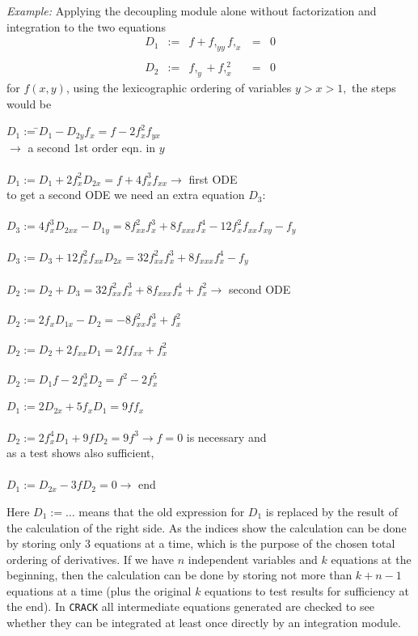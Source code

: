 {\em Example:}
Applying the decoupling module alone without factorization and integration 
to the two equations 
\[ \begin{array}{rclcl}
 D_1 & := & f + f,_{yy}f,_x & = & 0 \\ \\
 D_2 & := & f,_y + f,_x^2   & = & 0
\end{array} \]
for $f(x,y)$, using the lexicographic ordering of variables $y>x>1,$
the steps would be 
\begin{tabbing}
$D_1:=$\=$D_1-D_{2y}f_x=f-2f_x^2f_{yx}$ \\
     \> $\rightarrow$  a second 1st order eqn. in $y$\\ \\
$D_1:=$\>$D_1+2f_x^2D_{2x}=f+4f_x^3f_{xx} \rightarrow$  first ODE \\
     \> to get a second ODE we need an extra equation $D_3:$ \\ \\
$D_3:=$\>$4f_x^3D_{2xx}-D_{1y}=8f_{xx}^2f_x^3+8f_{xxx}f_x^4-12f_x^2f_{xx}f_{xy}
-f_y$ \\ \\
$D_3:=$\>$D_3+12f_x^2f_{xx}D_{2x}=32f_{xx}^2f_x^3+8f_{xxx}f_x^4-f_y$
\\ \\
$D_2:=$\>$D_2+D_3=32f_{xx}^2f_x^3+8f_{xxx}f_x^4+f_x^2 \rightarrow$ 
second ODE \\ \\
$D_2:=$\>$2f_xD_{1x}-D_2=-8f_{xx}^2f_x^3+f_x^2$ \\ \\
$D_2:=$\>$D_2+2f_{xx}D_1=2ff_{xx}+f_x^2$ \\ \\
$D_2:=$\>$D_1f-2f_x^3D_2=f^2-2f_x^5$ \\ \\
$D_1:=$\>$2D_{2x}+5f_xD_1=9ff_x$ \\ \\
$D_2:=$\>$2f_x^4D_1+9fD_2=9f^3 \rightarrow f=0$ is necessary and \\ 
     \> as a test shows also sufficient, \\ \\
$D_1:=$\>$D_{2x}-3fD_2=0 \rightarrow$ end
\end{tabbing} 
Here $D_1:=\ldots$ means that the old expression for $D_1$ is replaced
by the result of the calculation of the right side. As the indices
show the calculation can be done by storing only 3 equations at a time,
which is the purpose of the chosen total ordering of derivatives. If
we have $n$ independent variables and $k$ equations at the beginning,
then the calculation can be done by storing not more than $k+n-1$
equations at a time (plus the original $k$ equations to test results for
sufficiency at the end).
In {\tt CRACK} all intermediate equations generated are checked to see
whether they can be integrated at least once directly by an integration
module.

